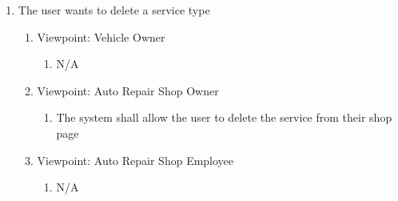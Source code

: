 \documentclass[12pt]{article}
\begin{document}
\begin{enumerate}[resume*=business_events]
	\item The user wants to delete a service type
	      \begin{enumerate}[VP\arabic*.]
		      \item Viewpoint: Vehicle Owner
		            \begin{enumerate}
			            \item[] N/A
		            \end{enumerate}
		      \item Viewpoint: Auto Repair Shop Owner
		            \begin{enumerate}
			            \item The system shall allow the user to delete the service from their shop page
		            \end{enumerate}
		      \item Viewpoint: Auto Repair Shop Employee
		            \begin{enumerate}
			            \item[] N/A
		            \end{enumerate}
	      \end{enumerate}
\end{enumerate}
\end{document}
